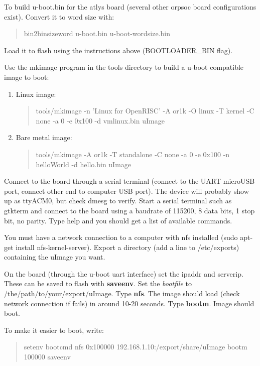 \documentclass[10pt,a4paper]{article}
\begin{document}
To build u-boot.bin for the atlys board (several other orpsoc board configurations exist). Convert it to word size with:

\begin{quote}
bin2binsizeword u-boot.bin u-boot-wordsize.bin
\end{quote}

Load it to flash using the instructions above (BOOTLOADER\_BIN flag).

Use the mkimage program in the tools directory to build a u-boot compatible image to boot:

\begin{enumerate}
\item Linux image:

\begin{quote}
tools/mkimage -n 'Linux for OpenRISC' -A or1k -O linux -T kernel -C none -a 0 -e 0x100 -d vmlinux.bin uImage
\end{quote}

\item Bare metal image:

\begin{quote}
tools/mkimage -A or1k -T standalone -C none -a 0 -e 0x100 -n helloWorld -d hello.bin uImage
\end{quote}

\end{enumerate}

Connect to the board through a serial terminal (connect to the UART microUSB port, connect other end to computer USB port). The device will probably show up as ttyACM0, but check dmesg to verify. Start a serial terminal such as gtkterm and connect to the board using a baudrate of 115200, 8 data bits, 1 stop bit, no parity. Type help and you should get a list of available commands.

You must have a network connection to a computer with nfs installed (sudo apt-get install nfs-kernel-server). Export a directory (add a line to /etc/exports) containing the uImage you want.

On the board (through the u-boot uart interface) set the ipaddr and serverip. These can be saved to flash with \textbf{saveenv}. Set the \textit{bootfile} to /the/path/to/your/export/uImage. Type \textbf{nfs}. The image should load (check network connection if fails) in around 10-20 seconds. Type \textbf{bootm}. Image should boot.

To make it easier to boot, write:

\begin{quote}
setenv bootcmd nfs 0x100000 192.168.1.10:/export/share/uImage \; bootm 100000 \newline
saveenv
\end{quote}
\end{document}
